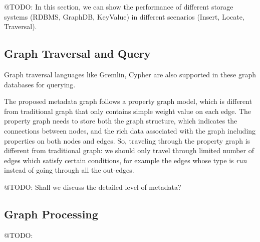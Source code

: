 @TODO: In this section, we can show the performance of different storage systems (RDBMS, GraphDB, KeyValue) in different scenarios (Insert, Locate, Traversal). 


\subsection{Graph Traversal and Query}
Graph traversal languages like Gremlin, Cypher are also supported in these graph databases for querying. 

The proposed metadata graph follows a property graph model, which is different from traditional graph that only contains simple weight value on each edge. The property graph needs to store both the graph structure, which indicates the connections between nodes, and the rich data associated with the graph including properties on both nodes and edges. So, traveling through the property graph is different from traditional graph: we should only travel through limited number of edges which satisfy certain conditions, for example the edges whose type is \textit{run} instead of going through all the out-edges. 

@TODO: Shall we discuss the detailed level of metadata? 

\subsection{Graph Processing}

@TODO: 




